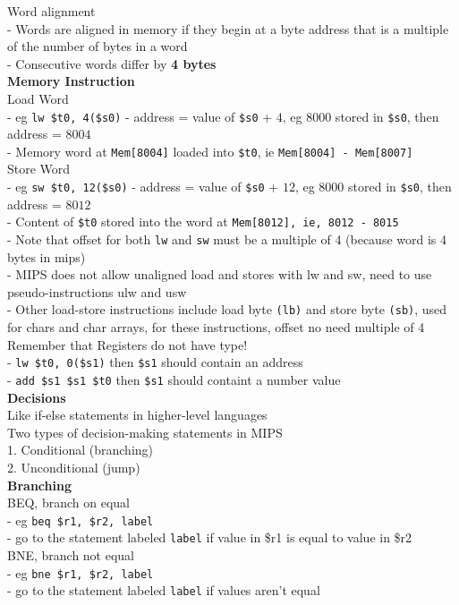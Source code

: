 \documentclass[10pt, a4paper]{article}
\begin{document}
\begin{multicols*}{3}
		Word alignment\\
		- Words are aligned in memory if they begin at a byte address that is a multiple of the number of bytes in a word\\
		- Consecutive words differ by \textbf{4 bytes}\\
		
		\textbf{Memory Instruction}\\
		Load Word\\
		- eg \texttt{lw \$t0, 4(\$s0)}
		- address = value of \texttt{\$s0} + $4$, eg $8000$ stored in \texttt{\$s0}, then address = $8004$\\
		- Memory word at \texttt{Mem[8004]} loaded into \texttt{\$t0}, ie \texttt{Mem[8004] - Mem[8007]}\\
		Store Word\\
		- eg \texttt{sw \$t0, 12(\$s0)}
		- address = value of \texttt{\$s0} + $12$, eg $8000$ stored in \texttt{\$s0}, then address = $8012$\\
		- Content of \texttt{\$t0} stored into the word at \texttt{Mem[8012], ie, 8012 - 8015}\\
		
		- Note that offset for both \texttt{lw} and \texttt{sw} must be a multiple of 4 (because word is 4 bytes in mips)\\
		- MIPS does not allow unaligned load and stores with lw and sw, need to use pseudo-instructions ulw and usw\\
		- Other load-store instructions include load byte \texttt{(lb)} and store byte \texttt{(sb)}, used for chars and char arrays, for these instructions, offset no need multiple of 4\\
		
		Remember that Registers do not have type!\\
		- \texttt{lw \$t0, 0(\$s1)} then \texttt{\$s1} should contain an address\\
		- \texttt{add \$s1 \$s1 \$t0} then \texttt{\$s1} should containt a number value\\
		  
		\textbf{Decisions}\\
		Like if-else statements in higher-level languages\\
		Two types of decision-making statements in MIPS\\
		1. Conditional (branching)\\
		2. Unconditional (jump)\\
		
		\textbf{Branching}\\
		BEQ, branch on equal\\
		- eg \texttt{beq \$r1, \$r2, label}\\
		- go to the statement labeled \texttt{label} if value in \$r1 is equal to value in \$r2\\
		BNE, branch not equal\\
		- eg \texttt{bne \$r1, \$r2, label}\\
		- go to the statement labeled \texttt{label} if values aren't equal\\
		

\end{multicols*}
\end{document}
